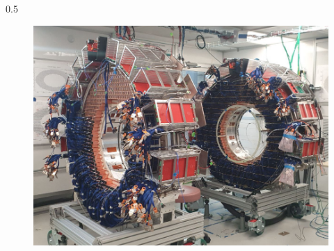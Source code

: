 \documentclass{beamer}
\begin{document}
\begin{frame}
\begin{columns}
\begin{column}{0.5\framewidth}
\begin{figure}[h]
            \includegraphics[width=\columnwidth]{figures/png/Screenshot_20240706_151533.png}
        \end{figure}
        \end{column}
    \end{columns}
\end{frame}
\end{document}
